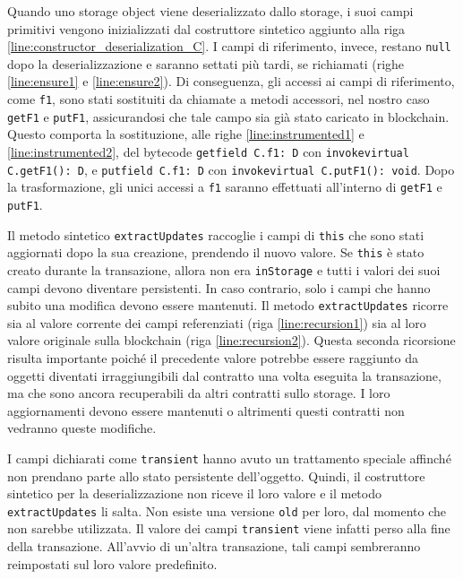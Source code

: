 %
Quando uno storage object viene deserializzato dallo storage, i suoi campi primitivi vengono inizializzati dal costruttore sintetico aggiunto alla riga \ref{line:constructor_deserialization_C}. I campi di riferimento, invece, restano \lstinline|null| dopo la deserializzazione e saranno settati più tardi, se richiamati (righe \ref{line:ensure1} e \ref{line:ensure2}). Di conseguenza, gli accessi ai campi di riferimento, come \lstinline|f1|, sono stati sostituiti da chiamate a metodi accessori, nel nostro caso \lstinline|getF1| e \lstinline|putF1|, assicurandosi che tale campo sia già stato caricato in blockchain. Questo comporta la sostituzione, alle righe \ref{line:instrumented1} e \ref{line:instrumented2}, del bytecode \lstinline|getfield C.f1: D| con \lstinline|invokevirtual C.getF1(): D|, e \lstinline|putfield C.f1: D| con \lstinline|invokevirtual C.putF1(): void|. Dopo la trasformazione, gli unici accessi a \lstinline|f1| saranno effettuati all'interno di \lstinline|getF1| e \lstinline|putF1|. 

Il metodo sintetico \lstinline|extractUpdates| raccoglie i campi di \lstinline|this| che sono stati aggiornati dopo la sua creazione, prendendo il nuovo valore. Se \lstinline|this| è stato creato durante la transazione, allora non era \lstinline|inStorage| e tutti i valori dei suoi campi devono diventare persistenti. In caso contrario, solo i campi che hanno subito una modifica devono essere mantenuti. Il metodo \lstinline|extractUpdates| ricorre sia al valore corrente dei campi referenziati (riga \ref{line:recursion1}) sia al loro valore originale sulla blockchain (riga \ref{line:recursion2}). Questa seconda ricorsione risulta importante poiché il precedente valore potrebbe essere raggiunto da oggetti diventati irraggiungibili dal contratto una volta eseguita la transazione, ma che sono ancora recuperabili da altri contratti sullo storage. I loro aggiornamenti devono essere mantenuti o altrimenti questi contratti non vedranno queste modifiche.

I campi dichiarati come \lstinline|transient| hanno avuto un trattamento speciale affinché non prendano parte allo stato persistente dell'oggetto. Quindi, il costruttore sintetico per la deserializzazione non riceve il loro valore e il metodo \lstinline|extractUpdates| li salta. Non esiste una versione \lstinline|old| per loro, dal momento che non sarebbe utilizzata. Il valore dei campi \lstinline|transient| viene infatti perso alla fine della transazione. All'avvio di un'altra transazione, tali campi sembreranno reimpostati sul loro valore predefinito.


